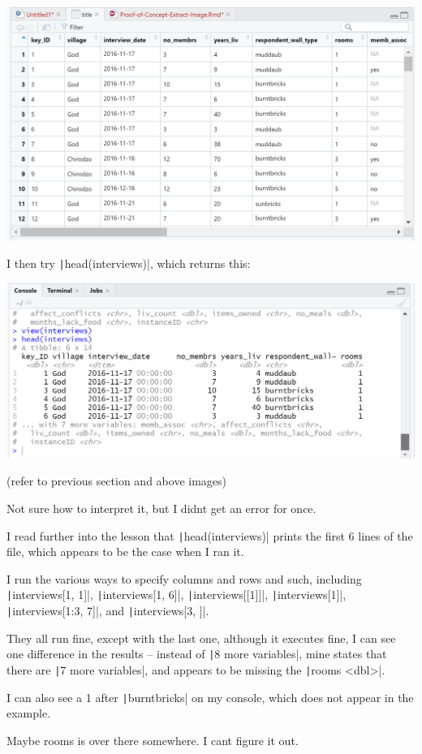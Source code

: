 \documentclass{article}
\begin{document}
\includegraphics[width=1.0\textwidth]{rstudio_17.PNG}

I then try \texttt|head(interviews)|, which returns this:

\includegraphics[width=1.0\textwidth]{rstudio_18.PNG}

{\item (refer to previous section and above images)
\item Not sure how to interpret it, but I didnt get an error for once.
\item I read further into the lesson that \texttt|head(interviews)| prints the first 6 lines of the file, which appears to be the case when I ran it.
\item I run the various ways to specify columns and rows and such, including \texttt|interviews[1, 1]|, \texttt|interviews[1, 6]|, \texttt|interviews[[1]]|, \texttt|interviews[1]|, \texttt|interviews[1:3, 7]|, and \texttt|interviews[3, ]|.
\item They all run fine, except with the last one, although it executes fine, I can see one difference in the results – instead of \texttt|8 more variables|, mine states that there are \texttt|7 more variables|, and appears to be missing the \texttt|rooms <dbl>|.
\item I can also see a 1 after \texttt|burntbricks| on my console, which does not appear in the example.
\item Maybe rooms is over there somewhere. I cant figure it out.}
\end{document}

